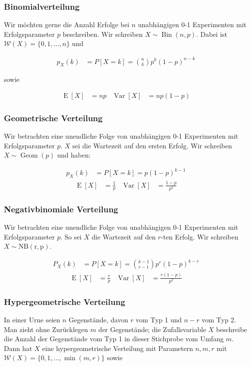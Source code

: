 \documentclass[25pt]{sciposter}
\newcommand{\W}{\mathcal{W}}
\newcommand{\Var}{\operatorname{Var}}
\newcommand{\E}{\operatorname{E}}
\begin{document}
\begin{multicols}{3}
\subsubsection*{Binomialverteilung}
Wir möchten gerne die Anzahl Erfolge bei $n$ unabhängigen 0-1 Experimenten mit Erfolgsparameter $p$ beschreiben. Wir schreiben $X \sim \operatorname{Bin}(n,p)$. Dabei ist $\W(X) = \{0,1,\ldots,n\}$ und 

\begin{align*}
	p_X(k) &= P[X=k] = {n \choose k} p^k (1-p)^{n-k}
\end{align*}

sowie 

\begin{align*}
	\E[X] &= np & \Var[X] &= np(1-p)
\end{align*}


\subsubsection*{Geometrische Verteilung}
Wir betrachten eine unendliche Folge von unabhängigen 0-1 Experimenten mit Erfolgsparameter $p$. $X$ sei die Wartezeit auf den ersten Erfolg. Wir schreiben $X\sim\operatorname{Geom}(p)$ und haben:

\begin{align*}
	p_X(k) &= P[X=k] = p(1-p)^{k-1}
\end{align*}
\begin{align*}
	\E[X] &= \frac{1}{p} & \Var[X] &= \frac{1-p}{p^2}
\end{align*}


\subsubsection*{Negativbinomiale Verteilung}
Wir betrachten eine unendliche Folge von unabhängigen 0-1 Experimenten mit Erfolgsparameter $p$. So sei $X$ die Wartezeit auf den $r$-ten Erfolg. Wir schreiben $X\sim \operatorname{NB(r,p)}$.

\begin{align*}
	P_X(k) &= P[X = k] = {k-1 \choose r-1} p^r(1-p)^{k-r}
\end{align*}
\begin{align*}
\E[X] &= \frac{r}{p} & \Var[X] &= \frac{r(1-p)}{p^2}
\end{align*}

\subsubsection*{Hypergeometrische Verteilung}
In einer Urne seien $n$ Gegenstände, davon $r$ vom Typ 1 und $n-r$ vom Typ 2. Man
zieht ohne Zurücklegen $m$ der Gegenstände; die Zufallsvariable $X$ beschreibe die Anzahl
der Gegenstände vom Typ 1 in dieser Stichprobe vom Umfang $m$. Dann hat $X$ eine
hypergeometrische Verteilung mit Parametern $n,m,r$ mit $\W(X) = \{0, 1, \ldots, \min(m, r)\}$ sowie


\end{multicols}
\end{document}
